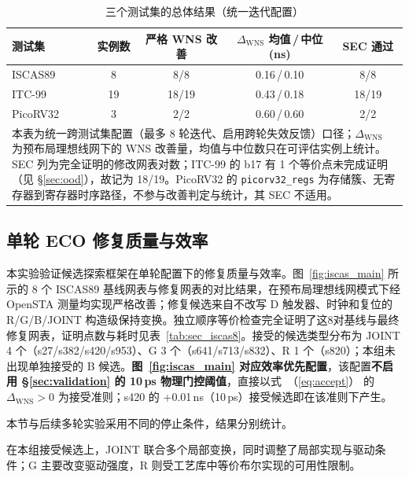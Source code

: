 \documentclass[twocolumn,10pt,fontset=windows]{ctexart}
\renewcommand{\eqref}[1]{\textup{（\ref{#1}）}}
\begin{document}
\begin{table}[!htb]
\centering
\caption{三个测试集的总体结果（统一迭代配置）}
\label{tab:overview}
\scriptsize
\setlength{\tabcolsep}{3pt}
\begin{tabular}{lcccc}
\toprule
\textbf{测试集} & \textbf{实例数} & \textbf{严格 WNS 改善} & \textbf{$\Delta_{\mathrm{WNS}}$ 均值\,/\,中位 (ns)} & \textbf{SEC 通过} \\
\midrule
ISCAS89  & 8  & 8/8   & 0.16\,/\,0.10 & 8/8 \\
ITC-99   & 19 & 18/19 & 0.43\,/\,0.18 & 18/19 \\
PicoRV32 & 3  & 2/2   & 0.60\,/\,0.60 & 2/2 \\
\bottomrule
\multicolumn{5}{p{0.95\columnwidth}}{\footnotesize 本表为统一跨测试集配置（最多 8 轮迭代、启用跨轮失效反馈）口径；$\Delta_{\mathrm{WNS}}$ 为预布局理想线网下的 WNS 改善量，均值与中位数只在可评估实例上统计。SEC 列为完全证明的修改网表对数；ITC-99 的 b17 有 1 个等价点未完成证明（见 \S\ref{sec:ood}），故记为 18/19。PicoRV32 的 \texttt{picorv32\_regs} 为存储簇、无寄存器到寄存器时序路径，不参与改善判定与统计，其 SEC 不适用。} \\
\end{tabular}
\end{table}

\subsection{单轮 ECO 修复质量与效率}\label{sec:iscas}

本实验验证候选探索框架在单轮配置下的修复质量与效率。图~\ref{fig:iscas_main} 所示的 8 个 ISCAS89 基线网表与修复网表的对比结果，在预布局理想线网模式下经 OpenSTA 测量均实现严格改善；修复候选来自不改写 D 触发器、时钟和复位的 R/G/B/JOINT 构造级保持变换。独立顺序等价检查完全证明了这8对基线与最终修复网表，证明点数与耗时见表~\ref{tab:sec_iscas8}。接受的候选类型分布为 JOINT 4 个（s27/s382/s420/s953）、G 3 个（s641/s713/s832）、R 1 个（s820）；本组未出现单独接受的 B 候选。\textbf{图~\ref{fig:iscas_main} 对应效率优先配置}\label{sec:eff_prio}，该配置\textbf{不启用 \S\ref{sec:validation} 的 10\,ps 物理门控阈值}，直接以式~\eqref{eq:accept} 的 $\Delta_{\mathrm{WNS}}>0$ 为接受准则；s420 的 +0.01\,ns（10\,ps）接受候选即在该准则下产生。

本节与后续多轮实验采用不同的停止条件，结果分别统计。

在本组接受候选上，JOINT 联合多个局部变换，同时调整了局部实现与驱动条件；G 主要改变驱动强度，R 则受工艺库中等价布尔实现的可用性限制。
\end{document}
